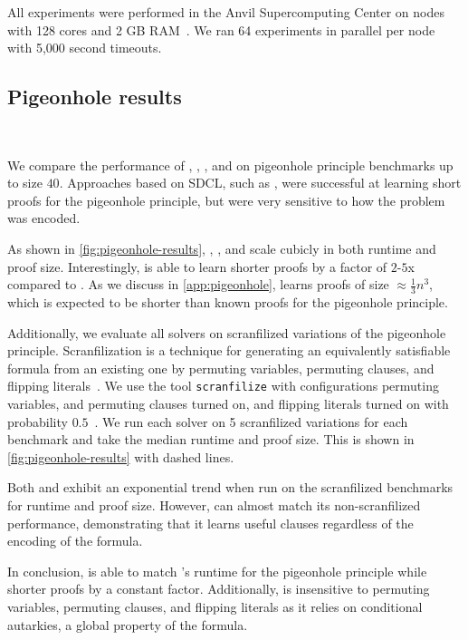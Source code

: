 All experiments were performed in the Anvil Supercomputing Center on nodes with
128 cores and 2 GB RAM~\cite{anvil}. We ran 64 experiments in parallel per node
with 5,000 second timeouts.

\subsection{Pigeonhole results}~\label{subsec:eval-pigeonhole}

We compare the performance of \tool, \cadical, \sadical, and \prelearn on
pigeonhole principle benchmarks up to size $40$. Approaches based on SDCL, such
as \sadical, were successful at learning short proofs for the pigeonhole
principle, but were very sensitive to how the problem was encoded.

As shown in \autoref{fig:pigeonhole-results}, \prelearn, \sadical, and \tool scale cubicly
in both runtime and proof size. Interestingly, \tool is able to learn shorter
proofs by a factor of $2$-$5$x compared to \sadical. As we discuss in
\autoref{app:pigeonhole}, \tool learns proofs of size $\approx \frac13 n^3$,
which is expected to be shorter than known \pr proofs for the pigeonhole principle.

Additionally, we evaluate all solvers on scranfilized variations of the
pigeonhole principle. Scranfilization is a technique for generating an
equivalently satisfiable formula from an existing one by permuting variables,
permuting clauses, and flipping literals~\cite{scranfilize}. We use the tool
\texttt{scranfilize} with configurations permuting variables,
and permuting clauses turned on, and flipping literals turned on with
probability $0.5$~\cite{scranfilize}. We run each solver on 5 scranfilized variations for
each benchmark and take the median runtime and proof size. This is shown in \autoref{fig:pigeonhole-results} with dashed lines.


Both \sadical and \cadical exhibit an exponential trend when run on the scranfilized benchmarks for runtime and proof size. However, \tool can almost match its non-scranfilized performance, demonstrating that it learns useful \pr clauses regardless of the encoding of the formula.

In conclusion, \tool is able to match \sadical's runtime for the pigeonhole principle while shorter proofs by a constant factor. Additionally, \tool is insensitive to permuting variables, permuting clauses, and flipping literals as it relies on conditional autarkies, a global property of the formula.



